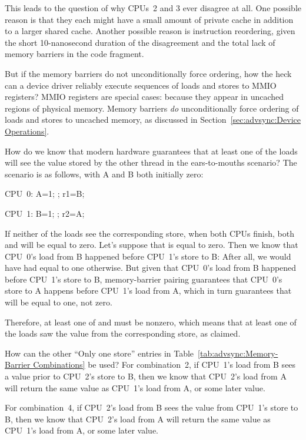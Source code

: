 	This leads to the question of why CPUs~2 and 3 ever disagree
	at all.
	One possible reason is that they each might have a small amount
	of private cache in addition to a larger shared cache.
	Another possible reason is instruction reordering, given the
	short 10-nanosecond duration of the disagreement and the
	total lack of memory barriers in the code fragment.

\QuickQ{}
	But if the memory barriers do not unconditionally force
	ordering, how the heck can a device driver reliably execute
	sequences of loads and stores to MMIO registers?
\QuickA{}
	MMIO registers are special cases: because they appear
	in uncached regions of physical memory.
	Memory barriers \emph{do} unconditionally force ordering
	of loads and stores to uncached memory, as discussed in
	Section~\ref{sec:advsync:Device Operations}.

\QuickQ{}
	How do we know that modern hardware guarantees that at least
	one of the loads will see the value stored by the other thread
	in the ears-to-mouths scenario?
\QuickA{}
	The scenario is as follows, with A and B both initially zero:

	CPU~0: A=1; ; r1=B;

	CPU~1: B=1; ; r2=A;

	If neither of the loads see the corresponding store, when both
	CPUs finish, both  and  will be equal to zero.
	Let's suppose that  is equal to zero.
	Then we know that CPU~0's load from B happened before CPU~1's
	store to B: After all, we would have had  equal to one
	otherwise.
	But given that CPU~0's load from B happened before CPU~1's store
	to B, memory-barrier pairing guarantees that CPU~0's store to A
	happens before CPU~1's load from A, which in turn guarantees that
	 will be equal to one, not zero.

	Therefore, at least one of  and  must be nonzero,
	which means that at least one of the loads saw the value from
	the corresponding store, as claimed.

\QuickQ{}
	How can the other ``Only one store'' entries in
	Table~\ref{tab:advsync:Memory-Barrier Combinations}
	be used?
\QuickA{}
	For combination~2, if CPU~1's load from B sees a value prior
	to CPU~2's store to B, then we know that CPU~2's load from A
	will return the same value as CPU~1's load from A, or some later
	value.

	For combination~4, if CPU~2's load from B sees the value from
	CPU~1's store to B, then we know that CPU~2's load from A
	will return the same value as CPU~1's load from A, or some later
	value.

